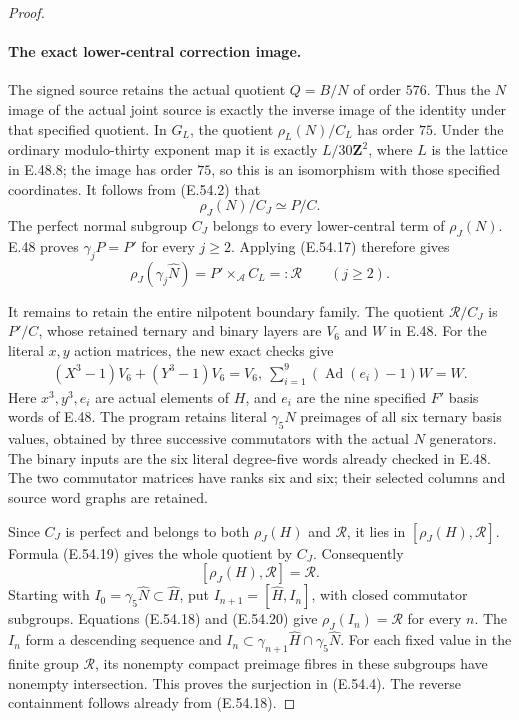 \begin{proof}
\paragraph{The exact lower-central correction image.}
The signed source retains the actual quotient $Q=B/N$ of
order $576$.  Thus the $N$ image of the actual joint source
is exactly the inverse image of the identity under that
specified quotient.  In $G_L$, the quotient
$\rho_L(N)/C_L$ has order $75$.  Under the ordinary
modulo-thirty exponent map it is exactly
$L/30\mathbf Z^2$, where $L$ is the lattice in E.48.8;
the image has order $75$, so this is an isomorphism with
those specified coordinates.
It follows from \textup{(E.54.2)} that
\[
       \rho_J(N)/C_J\simeq P/C.
 \tag{E.54.17}
\]
The perfect normal subgroup $C_J$ belongs to every
lower-central term of $\rho_J(N)$.  E.48 proves
$\gamma_jP=P'$ for every $j\ge2$.  Applying
\textup{(E.54.17)} therefore gives
\[
       \rho_J(\gamma_j\widehat N)
          =P'\times_{\mathcal A}C_L=:\mathcal R
                       \qquad(j\ge2).
 \tag{E.54.18}
\]

It remains to retain the entire nilpotent boundary family.
The quotient $\mathcal R/C_J$ is $P'/C$, whose retained
ternary and binary layers are $V_6$ and $W$ in E.48.
For the literal $x,y$ action matrices, the new exact checks
give
\[
 \begin{gathered}
    (X^3-1)V_6+(Y^3-1)V_6=V_6,\
    \sum_{i=1}^{9}(\operatorname{Ad}(e_i)-1)W=W.
 \end{gathered}
 \tag{E.54.19}
\]
Here $x^3,y^3,e_i$ are actual elements of $H$, and $e_i$
are the nine specified $F'$ basis words of E.48.  The
program retains literal $\gamma_5N$ preimages of all six
ternary basis values, obtained by three successive
commutators with the actual $N$ generators.  The binary
inputs are the six literal degree-five words already
checked in E.48.  The two commutator matrices have ranks
six and six; their selected columns and source word graphs
are retained.

Since $C_J$ is perfect and belongs to both $\rho_J(H)$ and
$\mathcal R$, it lies in $[\rho_J(H),\mathcal R]$.
Formula \textup{(E.54.19)} gives the whole quotient by
$C_J$.  Consequently
\[
                  [\rho_J(H),\mathcal R]=\mathcal R.
 \tag{E.54.20}
\]
Starting with $I_0=\gamma_5\widehat N\subset\widehat H$,
put $I_{n+1}=[\widehat H,I_n]$, with closed commutator
subgroups.  Equations \textup{(E.54.18)} and
\textup{(E.54.20)} give $\rho_J(I_n)=\mathcal R$ for every
$n$.  The $I_n$ form a descending sequence and
$I_n\subset\gamma_{n+1}\widehat H\cap\gamma_5\widehat N$.
For each fixed value in the finite group $\mathcal R$,
its nonempty compact preimage fibres in these subgroups
have nonempty intersection.  This proves the surjection
in \textup{(E.54.4)}.  The reverse containment follows
already from \textup{(E.54.18)}.


\end{proof}
